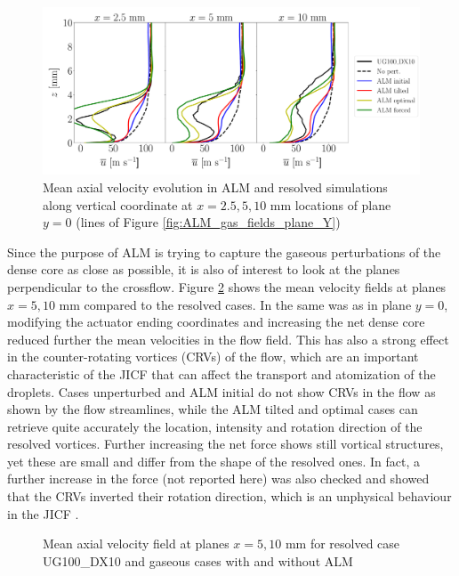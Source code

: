 \begin{figure}[ht]
\centering
   \includegraphics[scale=0.26]{./part2_developments/figures_ch6_lagrangian_JICF/gas_field_initial_conditions/ALM_lines_y0_along_z_ux_mean}
\caption{Mean axial velocity evolution in ALM and resolved simulations along vertical coordinate at $x = 2.5, 5, 10$ mm locations of plane $y = 0$ (lines of Figure \ref{fig:ALM_gas_fields_plane_Y})}
\label{fig:JICF_ICS_ALM_lines_y0_along_z_ux_mean}
\end{figure}

Since the purpose of ALM is trying to capture the gaseous perturbations of the dense core as close as possible, it is also of interest to look at the planes perpendicular to the crossflow. Figure \ref{fig:ALM_gas_fields_plane_x} shows the mean velocity fields at planes $x = 5, 10$ mm compared to the resolved cases. In the same was as in plane $y = 0$, modifying the actuator ending coordinates and increasing the net dense core reduced further the mean velocities in the flow field. This has also a strong effect in the counter-rotating vortices (CRVs) of the flow, which are an important characteristic of the JICF that can affect the transport and atomization of the droplets. Cases unperturbed and ALM initial do not show CRVs in the flow as shown by the flow streamlines, while the ALM tilted and optimal cases can retrieve quite accurately the location,  intensity and rotation direction of the resolved vortices. Further increasing the net force shows still vortical structures, yet these are small and differ from the shape of the resolved ones. In fact, a further increase in the force (not reported here) was also checked and showed that the CRVs inverted their rotation direction, which is an unphysical behaviour in the JICF .


\begin{figure}[h!]	
	\centering	{}
	\caption{Mean axial velocity field at planes $x = 5, 10$ mm for resolved case UG100\_DX10 and gaseous cases with and without ALM}
	\label{fig:ALM_gas_fields_plane_x}
\end{figure}

